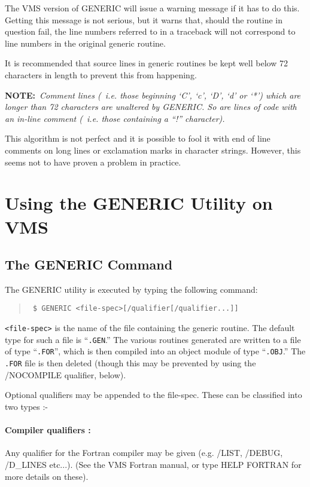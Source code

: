 The VMS version of GENERIC will issue a warning message if it has to do this.
Getting this message is not serious, but it warns that, should the
routine in question fail, the line numbers referred to in a traceback
will not correspond to line numbers in the original generic routine.

It is recommended that source lines in generic routines be kept
well below 72 characters in length to prevent this from happening.

{\bf NOTE:}~{\it Comment lines (~{\rm i.e.} those beginning `C', `c', `D', `d' 
or `*') which are longer than 72 characters are unaltered by GENERIC.
So are lines of code with an in-line comment (~{\rm i.e.} those containing
a ``!'' character).}

This algorithm is not perfect and it is possible to fool it with end of line
comments on long lines or exclamation marks in character strings. However, this
seems not to have proven a problem in practice.

\section{Using the GENERIC Utility on VMS}

\subsection{The GENERIC Command}

The GENERIC utility is executed by typing the following command:

\begin{quote}{\tt
\$ GENERIC  <file-spec>[/qualifier[/qualifier...]]
}
\end{quote}

\verb+<file-spec>+ is the name of the file containing the generic routine.
The default type for such a file is ``{\tt .GEN}.''
The various routines generated are written to a file of type ``{\tt .FOR}'',
which is then compiled into an object module of type ``{\tt .OBJ}.''
The {\tt .FOR} file is then deleted (though this may be prevented by using
the /NOCOMPILE qualifier, below).

Optional qualifiers may be appended to the file-spec.
These can be classified into two types :-

\paragraph{Compiler qualifiers :}
Any qualifier for the Fortran compiler may be given
(e.g. /LIST, /DEBUG, /D\_LINES etc...). (See the VMS Fortran manual,
or type HELP FORTRAN for more details on these).


